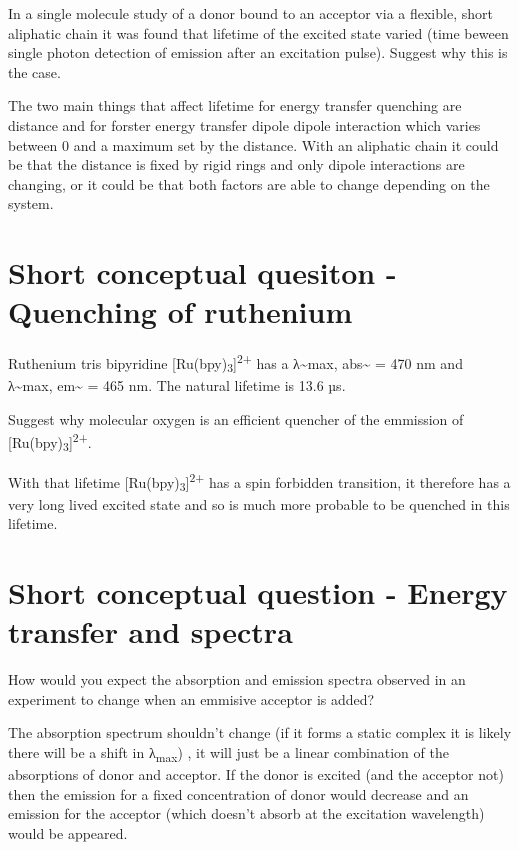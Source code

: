 \documentclass[
]{book}
\begin{document}
In a single molecule study of a donor bound to an acceptor via a flexible, short aliphatic chain it was found that lifetime of the excited state varied (time beween single photon detection of emission after an excitation pulse). Suggest why this is the case.

The two main things that affect lifetime for energy transfer quenching are distance and for forster energy transfer dipole dipole interaction which varies between 0 and a maximum set by the distance. With an aliphatic chain it could be that the distance is fixed by rigid rings and only dipole interactions are changing, or it could be that both factors are able to change depending on the system.

\hypertarget{sec:ruquench}{%
\section{Short conceptual quesiton - Quenching of ruthenium}\label{sec:ruquench}}

Ruthenium tris bipyridine {[}Ru(bpy)\textsubscript{3}{]}\textsuperscript{2+} has a λ\textasciitilde max, abs\textasciitilde{} = 470 nm and λ\textasciitilde max, em\textasciitilde{} = 465 nm. The natural lifetime is 13.6 µs.

Suggest why molecular oxygen is an efficient quencher of the emmission of {[}Ru(bpy)\textsubscript{3}{]}\textsuperscript{2+}.

With that lifetime {[}Ru(bpy)\textsubscript{3}{]}\textsuperscript{2+} has a spin forbidden transition, it therefore has a very long lived excited state and so is much more probable to be quenched in this lifetime.

\hypertarget{sec:spectra}{%
\section{Short conceptual question - Energy transfer and spectra}\label{sec:spectra}}

How would you expect the absorption and emission spectra observed in an experiment to change when an emmisive acceptor is added?

The absorption spectrum shouldn't change (if it forms a static complex it is likely there will be a shift in λ\textsubscript{max}) , it will just be a linear combination of the absorptions of donor and acceptor. If the donor is excited (and the acceptor not) then the emission for a fixed concentration of donor would decrease and an emission for the acceptor (which doesn't absorb at the excitation wavelength) would be appeared.
\end{document}
